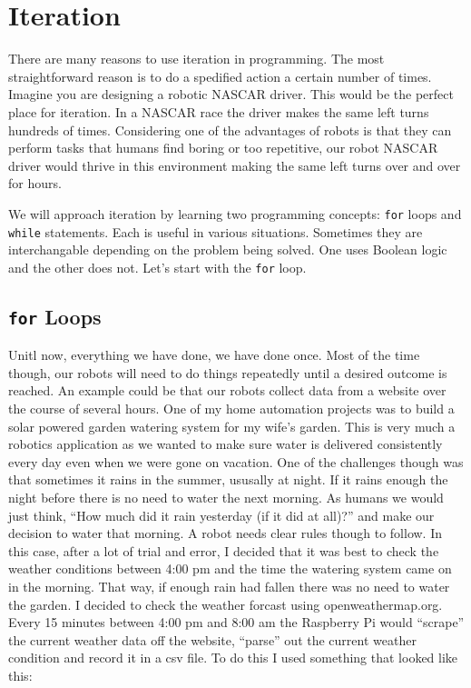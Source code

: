 \documentclass[
]{book}
\begin{document}
\hypertarget{iteration}{%
\section{Iteration}\label{iteration}}

There are many reasons to use iteration in programming. The most straightforward reason is to do a spedified action a certain number of times. Imagine you are designing a robotic NASCAR driver. This would be the perfect place for iteration. In a NASCAR race the driver makes the same left turns hundreds of times. Considering one of the advantages of robots is that they can perform tasks that humans find boring or too repetitive, our robot NASCAR driver would thrive in this environment making the same left turns over and over for hours.

We will approach iteration by learning two programming concepts: \texttt{for} loops and \texttt{while} statements. Each is useful in various situations. Sometimes they are interchangable depending on the problem being solved. One uses Boolean logic and the other does not. Let's start with the \texttt{for} loop.

\hypertarget{for-loops}{%
\subsection{\texorpdfstring{\texttt{for} Loops}{for Loops}}\label{for-loops}}

Unitl now, everything we have done, we have done once. Most of the time though, our robots will need to do things repeatedly until a desired outcome is reached. An example could be that our robots collect data from a website over the course of several hours. One of my home automation projects was to build a solar powered garden watering system for my wife's garden. This is very much a robotics application as we wanted to make sure water is delivered consistently every day even when we were gone on vacation. One of the challenges though was that sometimes it rains in the summer, ususally at night. If it rains enough the night before there is no need to water the next morning. As humans we would just think, ``How much did it rain yesterday (if it did at all)?'' and make our decision to water that morning. A robot needs clear rules though to follow. In this case, after a lot of trial and error, I decided that it was best to check the weather conditions between 4:00 pm and the time the watering system came on in the morning. That way, if enough rain had fallen there was no need to water the garden. I decided to check the weather forcast using openweathermap.org. Every 15 minutes between 4:00 pm and 8:00 am the Raspberry Pi would ``scrape'' the current weather data off the website, ``parse'' out the current weather condition and record it in a csv file. To do this I used something that looked like this:
\end{document}
